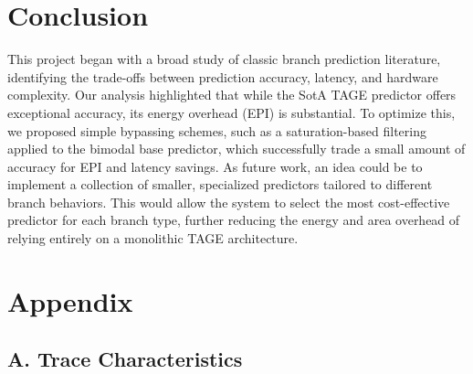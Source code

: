 \documentclass[11pt,a4paper,twocolumn]{article}
\begin{document}
\section{Conclusion}
\label{sec:conclusion}

This project began with a broad study of classic branch prediction literature, identifying the trade-offs between prediction accuracy, latency, and hardware complexity. Our analysis highlighted that while the SotA TAGE predictor offers exceptional accuracy, its energy overhead (EPI) is substantial. To optimize this, we proposed simple bypassing schemes, such as a saturation-based filtering applied to the bimodal base predictor, which successfully trade a small amount of accuracy for EPI and latency savings. As future work, an idea could be to implement a collection of smaller, specialized predictors tailored to different branch behaviors. This would allow the system to select the most cost-effective predictor for each branch type, further reducing the energy and area overhead of relying entirely on a monolithic TAGE architecture.

\clearpage


\nocite{kise2005bimode}
\nocite{sutar2025towards}



\appendix
\section*{Appendix}
\subsection*{A. Trace Characteristics}
\label{sec:appendix_traces}
\end{document}
